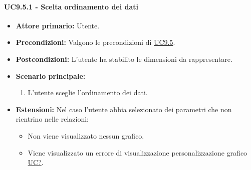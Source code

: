 \paragraph{UC9.5.1 - Scelta ordinamento dei dati}
\label{sec:UC9.5.1}
    \begin{itemize}
        \item \textbf{Attore primario:} Utente.
        \item \textbf{Precondizioni:} Valgono le precondizioni di \hyperref[sec:UC9.5]{UC9.5}.
	    \item \textbf{Postcondizioni:} L'utente ha stabilito le dimensioni da rappresentare.
	    \item \textbf{Scenario principale:}
	    \begin{enumerate}
	    		\item L'utente sceglie l'ordinamento dei dati.
		\end{enumerate}
		\item \textbf{Estensioni:} Nel caso l'utente abbia selezionato dei parametri che non rientrino nelle relazioni:
              \begin{itemize}
                  \item Non viene visualizzato nessun grafico.
                  \item Viene visualizzato un errore di visualizzazione personalizzazione grafico \hyperref[sec:UC - Errore di personalizzazione]{UC?}.
              \end{itemize}
    \end{itemize}


\newpage

